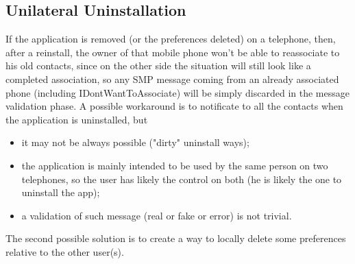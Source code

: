 \subsection{Unilateral Uninstallation}
If the application is removed (or the preferences deleted) on a telephone, then, after a reinstall, the owner of that mobile phone won't be able to reassociate to his old contacts, since on the other side the situation will still look like a completed association, so any SMP message coming from an already associated phone (including IDontWantToAssociate) will be simply discarded in the message validation phase. A possible workaround is to notificate to all the contacts when the application is uninstalled, but\\
\begin{itemize}
\item it may not be always possible ("dirty" uninstall ways);
\item the application is mainly intended to be used by the same person on two telephones, so the user has likely the control on both (he is likely the one to uninstall the app);
\item a validation of such message (real or fake or error) is not trivial.
\end{itemize}
\vspace{0.7cm}
The second possible solution is to create a way to locally delete some preferences relative to the other user(s).